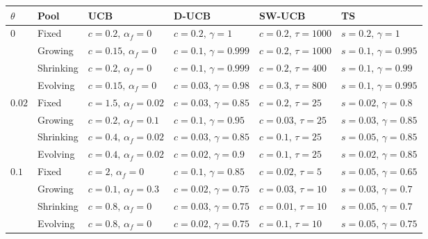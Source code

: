 \begin{tabular}{llllll}
\toprule
$\theta$ & Pool & UCB & D-UCB & SW-UCB & TS\\
\midrule
$0$ & Fixed & $c{=}0.2,\,\alpha_f{=}0$ & $c{=}0.2,\,\gamma{=}1$ & $c{=}0.2,\,\tau{=}1000$ & $s{=}0.2,\,\gamma{=}1$\\
 & Growing & $c{=}0.15,\,\alpha_f{=}0$ & $c{=}0.1,\,\gamma{=}0.999$ & $c{=}0.2,\,\tau{=}1000$ & $s{=}0.1,\,\gamma{=}0.995$\\
 & Shrinking & $c{=}0.2,\,\alpha_f{=}0$ & $c{=}0.1,\,\gamma{=}0.999$ & $c{=}0.2,\,\tau{=}400$ & $s{=}0.1,\,\gamma{=}0.99$\\
 & Evolving & $c{=}0.15,\,\alpha_f{=}0$ & $c{=}0.03,\,\gamma{=}0.98$ & $c{=}0.3,\,\tau{=}800$ & $s{=}0.1,\,\gamma{=}0.995$\\
\midrule
$0.02$ & Fixed & $c{=}1.5,\,\alpha_f{=}0.02$ & $c{=}0.03,\,\gamma{=}0.85$ & $c{=}0.2,\,\tau{=}25$ & $s{=}0.02,\,\gamma{=}0.8$\\
 & Growing & $c{=}0.2,\,\alpha_f{=}0.1$ & $c{=}0.1,\,\gamma{=}0.95$ & $c{=}0.03,\,\tau{=}25$ & $s{=}0.03,\,\gamma{=}0.85$\\
 & Shrinking & $c{=}0.4,\,\alpha_f{=}0.02$ & $c{=}0.03,\,\gamma{=}0.85$ & $c{=}0.1,\,\tau{=}25$ & $s{=}0.05,\,\gamma{=}0.85$\\
 & Evolving & $c{=}0.4,\,\alpha_f{=}0.02$ & $c{=}0.02,\,\gamma{=}0.9$ & $c{=}0.1,\,\tau{=}25$ & $s{=}0.02,\,\gamma{=}0.85$\\
\midrule
$0.1$ & Fixed & $c{=}2,\,\alpha_f{=}0$ & $c{=}0.1,\,\gamma{=}0.85$ & $c{=}0.02,\,\tau{=}5$ & $s{=}0.05,\,\gamma{=}0.65$\\
 & Growing & $c{=}0.1,\,\alpha_f{=}0.3$ & $c{=}0.02,\,\gamma{=}0.75$ & $c{=}0.03,\,\tau{=}10$ & $s{=}0.03,\,\gamma{=}0.7$\\
 & Shrinking & $c{=}0.8,\,\alpha_f{=}0$ & $c{=}0.03,\,\gamma{=}0.75$ & $c{=}0.01,\,\tau{=}10$ & $s{=}0.05,\,\gamma{=}0.7$\\
 & Evolving & $c{=}0.8,\,\alpha_f{=}0$ & $c{=}0.02,\,\gamma{=}0.75$ & $c{=}0.1,\,\tau{=}10$ & $s{=}0.05,\,\gamma{=}0.75$\\
\bottomrule
\end{tabular}
